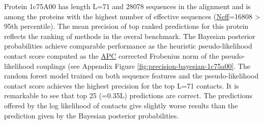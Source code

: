 \documentclass[11pt,a4paper,twoside]{book}
\theoremstyle{definition}
\theoremstyle{definition}
\theoremstyle{remark}
\begin{document}
Protein 1c75A00 has length L=71 and 28078 sequences in the alignment and
is among the proteins with the highest number of effective sequences
(\protect\hyperlink{abbrev}{Neff}=16808 \textgreater{} 95th percentile).
The mean precision of top ranked predictions for this protein reflects
the ranking of methods in the overal benchmark. The Bayesian posterior
probabilities achieve comparable performance as the heuristic
pseudo-likelihood contact score computed as the
\protect\hyperlink{abbrev}{APC} corrected Frobenius norm of the
pseudo-likelihood couplings (see Appendix Figure
\ref{fig:precision-bayesian-1c75a00}. The random forest model trained on
both sequence features and the pseudo-likelihood contact score achieves
the highest precision for the top L=71 contacts. It is remarkable to see
that top 25 (=0.35L) predictions are correct. The predictions offered by
the log likelihood of contacts give slightly worse results than the
prediction given by the Bayesian posterior probabilities.
\end{document}
